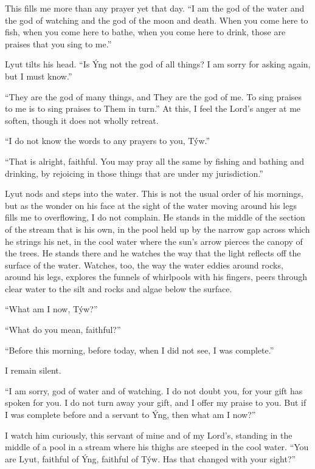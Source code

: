 This fills me more than any prayer yet that day. ``I am the god of the water and the god of watching and the god of the moon and death. When you come here to fish, when you come here to bathe, when you come here to drink, those are praises that you sing to me.''

Lyut tilts his head. ``Is Ýng not the god of all things? I am sorry for asking again, but I must know.''

``They are the god of many things, and They are the god of me. To sing praises to me is to sing praises to Them in turn.'' At this, I feel the Lord's anger at me soften, though it does not wholly retreat.

``I do not know the words to any prayers to you, Týw.''

``That is alright, faithful. You may pray all the same by fishing and bathing and drinking, by rejoicing in those things that are under my jurisdiction.''

Lyut nods and steps into the water. This is not the usual order of his mornings, but as the wonder on his face at the sight of the water moving around his legs fills me to overflowing, I do not complain. He stands in the middle of the section of the stream that is his own, in the pool held up by the narrow gap across which he strings his net, in the cool water where the sun's arrow pierces the canopy of the trees. He stands there and he watches the way that the light reflects off the surface of the water. Watches, too, the way the water eddies around rocks, around his legs, explores the funnels of whirlpools with his fingers, peers through clear water to the silt and rocks and algae below the surface.

``What am I now, Týw?''

``What do you mean, faithful?''

``Before this morning, before today, when I did not see, I was complete.''

I remain silent.

``I am sorry, god of water and of watching. I do not doubt you, for your gift has spoken for you. I do not turn away your gift, and I offer my praise to you. But if I was complete before and a servant to Ýng, then what am I now?''

I watch him curiously, this servant of mine and of my Lord's, standing in the middle of a pool in a stream where his thighs are steeped in the cool water. ``You are Lyut, faithful of Ýng, faithful of Týw. Has that changed with your sight?''

